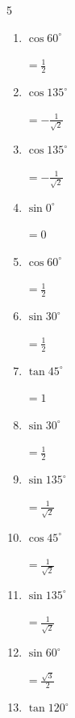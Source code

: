 \begin{multicols}{5}
\begin{enumerate}
        $\displaystyle =-\frac{1}{2}$

  \item $\displaystyle \cos{60^\circ}$

        $\displaystyle =\frac{1}{2}$

  \item $\displaystyle \cos{135^\circ}$

        $\displaystyle =-\frac{1}{\sqrt{2}}$

  \item $\displaystyle \cos{135^\circ}$

        $\displaystyle =-\frac{1}{\sqrt{2}}$

  \item $\displaystyle \sin{0^\circ}$

        $\displaystyle =0$

  \item $\displaystyle \cos{60^\circ}$

        $\displaystyle =\frac{1}{2}$

  \item $\displaystyle \sin{30^\circ}$

        $\displaystyle =\frac{1}{2}$

\columnbreak %

  \item $\displaystyle \tan{45^\circ}$

        $\displaystyle =1$

  \item $\displaystyle \sin{30^\circ}$

        $\displaystyle =\frac{1}{2}$

  \item $\displaystyle \sin{135^\circ}$

        $\displaystyle =\frac{1}{\sqrt{2}}$

  \item $\displaystyle \cos{45^\circ}$

        $\displaystyle =\frac{1}{\sqrt{2}}$

  \item $\displaystyle \sin{135^\circ}$

        $\displaystyle =\frac{1}{\sqrt{2}}$

  \item $\displaystyle \sin{60^\circ}$

        $\displaystyle =\frac{\sqrt{3}}{2}$

  \item $\displaystyle \tan{120^\circ}$


\end{enumerate}
\end{multicols}
